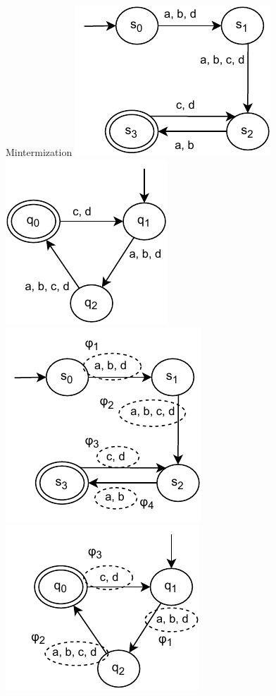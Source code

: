 \begin{frame}{Mintermization}
     {
    \centering\includegraphics[scale=1]{img/mintermization_automaton_m1.pdf}
    \hfill
    \centering\includegraphics[scale=1]{img/mintermization_automaton_m2.pdf}
    }
     {
    \centering\includegraphics[scale=1]{img/mintermization_automaton_m1_with_transition_sets.pdf}
    \hfill
    \centering\includegraphics[scale=1]{img/mintermization_automaton_m2_with_transition_sets.pdf}
}
\end{frame}
